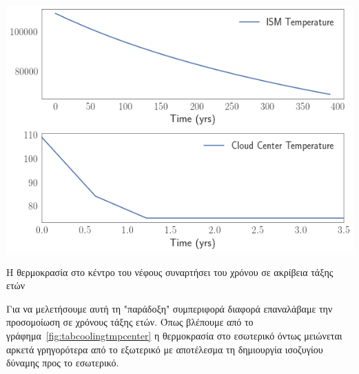 %		
%		

	
\begin{marginfigure}
	\includegraphics[width=1\linewidth]{DataImages/TabCoolingTMPcenterISM}
	\caption{Η θερμοκρασία στο κέντρο του νέφους συναρτήσει του χρόνου σε ακρίβεια τάξης ετών}
	\label{fig:tabcoolingtmpcenter}
\end{marginfigure}
	
	Για να μελετήσουμε αυτή τη "παράδοξη" συμπεριφορά διαφορά επαναλάβαμε την προσομοίωση σε χρόνους τάξης ετών. Όπως βλέπουμε από το γράφημα~\ref{fig:tabcoolingtmpcenter} η θερμοκρασία στο εσωτερικό όντως μειώνεται αρκετά γρηγορότερα από το εξωτερικό με αποτέλεσμα τη δημιουργία ισοζυγίου δύναμης προς το εσωτερικό.
	
